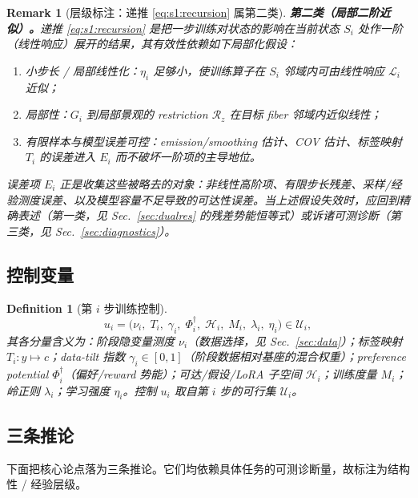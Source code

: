 \documentclass[11pt,a4paper]{article}
\newtheorem{definition}[theorem]{Definition}
\newtheorem{remark}[theorem]{Remark}
\newcommand{\cH}{\mathcal{H}}   %
\newcommand{\cL}{\mathcal{L}}   %
\newcommand{\cU}{\mathcal{U}}   %
\newcommand{\Rstr}{\mathcal{R}}     %
\begin{document}
\begin{remark}[层级标注：递推 \eqref{eq:s1:recursion} 属第二类]\label{rem:s1:tier-recursion}
\textbf{第二类（局部二阶近似）。}递推 \eqref{eq:s1:recursion} 是把一步训练对状态的影响在当前状态 $S_i$ 处作一阶（线性响应）展开的结果，其有效性依赖如下局部化假设：
\begin{enumerate}[label=(\alph*)]
  \item \emph{小步长 / 局部线性化}：$\eta_i$ 足够小，使训练算子在 $S_i$ 邻域内可由线性响应 $\cL_i$ 近似；
  \item \emph{局部性}：$G_i$ 到局部景观的 restriction $\Rstr_z$ 在目标 fiber 邻域内近似线性；
  \item \emph{有限样本与模型误差可控}：emission/smoothing 估计、COV 估计、标签映射 $T_i$ 的误差进入 $E_i$ 而不破坏一阶项的主导地位。
\end{enumerate}
误差项 $E_i$ 正是收集这些被略去的对象：非线性高阶项、有限步长残差、采样/经验测度误差、以及模型容量不足导致的可达性误差。当上述假设失效时，应回到精确表述（第一类，见 Sec.~\ref{sec:dualres} 的残差势能恒等式）或诉诸可测诊断（第三类，见 Sec.~\ref{sec:diagnostics}）。
\end{remark}

\subsection{控制变量}

\begin{definition}[第 $i$ 步训练控制]\label{def:s1:control}
\begin{equation}\label{eq:s1:control}
  u_i=\bigl(\nu_i,\;T_i,\;\gamma_i,\;\Phi_i^\dagger,\;\cH_i,\;M_i,\;\lambda_i,\;\eta_i\bigr)\in\cU_i,
\end{equation}
其各分量含义为：阶段隐变量测度 $\nu_i$（数据选择，见 Sec.~\ref{sec:data}）；标签映射 $T_i:y\mapsto c$；data-tilt 指数 $\gamma_i\in[0,1]$（阶段数据相对基座的混合权重）；preference potential $\Phi_i^\dagger$（偏好/reward 势能）；可达/假设/LoRA 子空间 $\cH_i$；训练度量 $M_i$；岭正则 $\lambda_i$；学习强度 $\eta_i$。控制 $u_i$ 取自第 $i$ 步的可行集 $\cU_i$。
\end{definition}

\subsection{三条推论}

下面把核心论点落为三条推论。它们均依赖具体任务的可测诊断量，故标注为结构性 / 经验层级。
\end{document}
